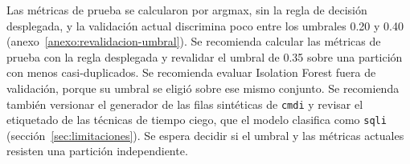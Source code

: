 Las métricas de prueba se calcularon por argmax, sin la regla de decisión desplegada, y la validación actual discrimina poco entre los umbrales 0.20 y 0.40 (anexo~\ref{anexo:revalidacion-umbral}). Se recomienda calcular las métricas de prueba con la regla desplegada y revalidar el umbral de 0.35 sobre una partición con menos casi-duplicados. Se recomienda evaluar Isolation Forest fuera de validación, porque su umbral se eligió sobre ese mismo conjunto. Se recomienda también versionar el generador de las filas sintéticas de \texttt{cmdi} y revisar el etiquetado de las técnicas de tiempo ciego, que el modelo clasifica como \texttt{sqli} (sección~\ref{sec:limitaciones}). Se espera decidir si el umbral y las métricas actuales resisten una partición independiente.

